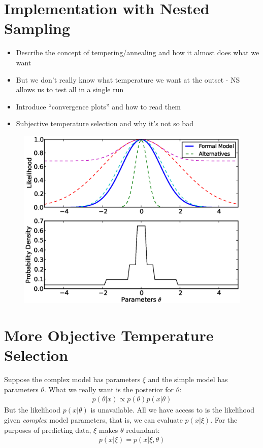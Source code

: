 \documentclass[letterpaper, 11pt]{article}
\begin{document}
\section{Implementation with Nested Sampling}
\begin{itemize}
\item Describe the concept of tempering/annealing and how it almost does what we want \\
\item But we don't really know what temperature we want at the outset - NS allows us to test all in a single run
\item Introduce ``convergence plots'' and how to read them
\item Subjective temperature selection and why it's not so bad
\end{itemize}

\begin{figure}
\begin{center}
\includegraphics[scale=0.7]{nested.eps}
\end{center}
\end{figure}

\section{More Objective Temperature Selection}
Suppose the complex model has parameters $\xi$ and the simple model
has parameters $\theta$. What we really want is the posterior for $\theta$:
\begin{eqnarray}
p(\theta|x) \propto p(\theta)p(x|\theta)
\end{eqnarray}
But the likelihood $p(x|\theta)$ is unavailable. All we have access to is the
likelihood given {\it complex} model parameters, that is, we can evaluate
$p(x|\xi)$. For the purposes of predicting data, $\xi$ makes $\theta$
redundant:
\begin{eqnarray}
p(x|\xi) = p(x|\xi, \theta)
\end{eqnarray}
\end{document}
